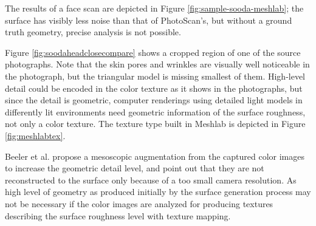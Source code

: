 The results of a face scan are depicted in Figure \ref{fig:sample-sooda-meshlab}; the surface has visibly less noise than that of PhotoScan's, but without a ground truth geometry, precise analysis is not possible.

Figure \ref{fig:soodaheadclosecompare} shows a cropped region of one of the source photographs.
Note that the skin pores and wrinkles are visually well noticeable in the photograph, but the triangular model is missing smallest of them.
High-level detail could be encoded in the color texture as it shows in the photographs, but since the detail is geometric, computer renderings using detailed light models in differently lit environments need geometric information of the surface roughness, not only a color texture.
The texture type built in Meshlab is depicted in Figure \ref{fig:meshlabtex}.

Beeler et al. propose a mesoscopic augmentation from the captured color images to increase the geometric detail level, and point out that they are not reconstructed to the surface only because of a too small camera resolution. \cite{beeler2010high}
As high level of geometry as produced initially by the surface generation process may not be necessary if the color images are analyzed for producing textures describing the surface roughness level with texture mapping.





